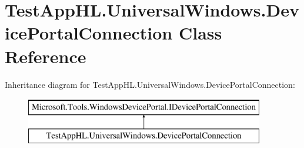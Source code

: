 \hypertarget{class_test_app_h_l_1_1_universal_windows_1_1_device_portal_connection}{}\section{Test\+App\+H\+L.\+Universal\+Windows.\+Device\+Portal\+Connection Class Reference}
\label{class_test_app_h_l_1_1_universal_windows_1_1_device_portal_connection}
Inheritance diagram for Test\+App\+H\+L.\+Universal\+Windows.\+Device\+Portal\+Connection\+:\begin{figure}[H]
\begin{center}
\leavevmode
\includegraphics[height=2.000000cm]{class_test_app_h_l_1_1_universal_windows_1_1_device_portal_connection}
\end{center}
\end{figure}
